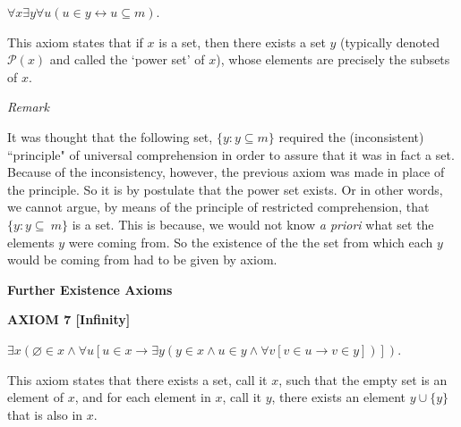 \documentclass[12pt, a4paper]{article}
\begin{document}
\vspace{4mm}

$\forall x\exists y\forall u(u\in y\leftrightarrow u\subseteq m)$.\par

\vspace{4mm}

\noindent This axiom states that if $x$ is a set, then there exists a set $y$ (typically denoted $\mathcal{P}(x)$ and called the `power set' of $x$), whose elements are precisely the subsets of $x$.\par

\vspace{6mm}

\noindent\large{\textit{Remark}}\normalsize\par

\vspace{4mm}

\noindent It was thought that the following set, $\{y\colon y\subseteq m\}$ required the (inconsistent) ``principle" of universal comprehension in order to assure that it was in fact a set. Because of the inconsistency, however, the previous axiom was made in place of the principle. So it is by postulate that the power set exists. Or in other words, we cannot argue, by means of the principle of restricted comprehension, that $\{y\colon y\subseteq\ m\}$ is a set. This is because, we would not know \textit{a priori} what set the elements $y$ were coming from. So the existence of the the set from which each $y$ would be coming from had to be given by axiom.\par

\vspace{10mm}

\noindent\large{\textbf{Further Existence Axioms}}\normalsize\par

\vspace{6mm}

\noindent\blacksquare\textbf{ AXIOM 7 [Infinity]}\par

\vspace{4mm}

$\exists x(\varnothing\in x\wedge\forall u[u\in x\rightarrow\exists y(y\in x\wedge u\in y\wedge\forall v[v\in u\rightarrow v\in y])])$.\par

\vspace{4mm}

\noindent This axiom states that there exists a set, call it $x$, such that the empty set is an element of $x$, and for each element in $x$, call it $y$, there exists an element $y\cup\{y\}$ that is also in $x$. 
\end{document}
